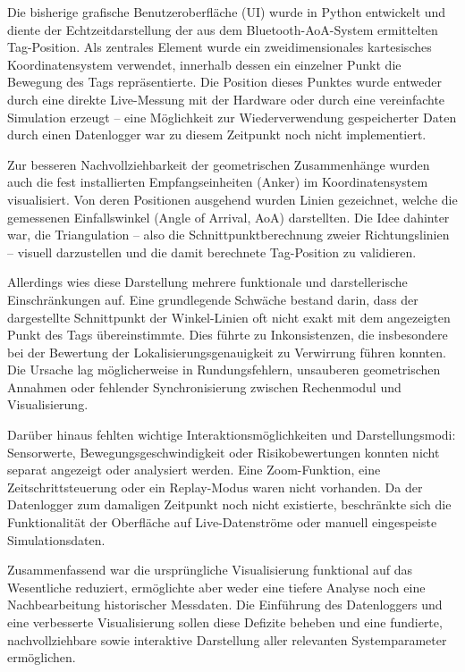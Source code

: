 \documentclass[a4paper, 12pt]{article} %
\begin{document}
Die bisherige grafische Benutzeroberfläche (UI) wurde in Python entwickelt und diente der Echtzeitdarstellung der aus dem Bluetooth-AoA-System ermittelten
 Tag-Position. Als zentrales Element wurde ein zweidimensionales kartesisches Koordinatensystem verwendet, innerhalb dessen ein einzelner Punkt die 
 Bewegung des Tags repräsentierte. Die Position dieses Punktes wurde entweder durch eine direkte Live-Messung mit der Hardware oder durch eine 
 vereinfachte Simulation erzeugt – eine Möglichkeit zur Wiederverwendung gespeicherter Daten durch einen Datenlogger war zu diesem Zeitpunkt noch nicht
  implementiert.

Zur besseren Nachvollziehbarkeit der geometrischen Zusammenhänge wurden auch die fest installierten Empfangseinheiten (Anker) im Koordinatensystem 
visualisiert. Von deren Positionen ausgehend wurden Linien gezeichnet, welche die gemessenen Einfallswinkel (Angle of Arrival, AoA) darstellten. Die 
Idee dahinter war, die Triangulation – also die Schnittpunktberechnung zweier Richtungslinien – visuell darzustellen und die damit berechnete Tag-Position
 zu validieren.

Allerdings wies diese Darstellung mehrere funktionale und darstellerische Einschränkungen auf. Eine grundlegende Schwäche bestand darin, dass der 
dargestellte Schnittpunkt der Winkel-Linien oft nicht exakt mit dem angezeigten Punkt des Tags übereinstimmte. Dies führte zu Inkonsistenzen, die 
insbesondere bei der Bewertung der Lokalisierungsgenauigkeit zu Verwirrung führen konnten. Die Ursache lag möglicherweise in Rundungsfehlern, unsauberen
 geometrischen Annahmen oder fehlender Synchronisierung zwischen Rechenmodul und Visualisierung.

Darüber hinaus fehlten wichtige Interaktionsmöglichkeiten und Darstellungsmodi: Sensorwerte, Bewegungsgeschwindigkeit oder Risikobewertungen konnten 
nicht separat angezeigt oder analysiert werden. Eine Zoom-Funktion, eine Zeitschrittsteuerung oder ein Replay-Modus waren nicht vorhanden. Da der 
Datenlogger zum damaligen Zeitpunkt noch nicht existierte, beschränkte sich die Funktionalität der Oberfläche auf Live-Datenströme oder manuell 
eingespeiste Simulationsdaten.

Zusammenfassend war die ursprüngliche Visualisierung funktional auf das Wesentliche reduziert, ermöglichte aber weder eine tiefere Analyse noch eine 
Nachbearbeitung historischer Messdaten. Die Einführung des Datenloggers und eine verbesserte Visualisierung sollen diese Defizite beheben und eine 
fundierte, nachvollziehbare sowie interaktive Darstellung aller relevanten Systemparameter ermöglichen.
\end{document}
